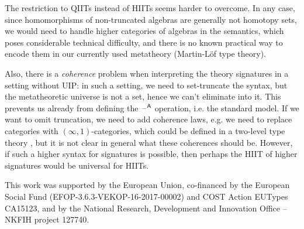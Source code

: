 \documentclass[acmsmall,review,anonymous]{acmart}\settopmatter{printfolios=true,printccs=false,printacmref=false}
\begin{document}
The restriction to QIITs instead of HIITs seems harder to overcome. In
any case, since homomorphisms of non-truncated algebras are generally
not homotopy sets, we would need to handle higher categories of
algebras in the semantics, which poses considerable technical
difficulty, and there is no known practical way to encode them in our
currently used metatheory (Martin-Löf type theory).

Also, there is a \emph{coherence} problem when interpreting the theory
signatures in a setting without UIP: in such a setting, we need to
set-truncate the syntax, but the metatheoretic universe is not a set,
hence we can't eliminate into it. This prevents us already from
defining the $\mathord{\hspace{1pt}\text{--}\hspace{1pt}}^{\mathsf{A}}$ operation, i.e. the standard model. If we
want to omit truncation, we need to add coherence laws, e.g. we need
to replace categories with $(\infty,1)$-categories, which could be
defined in a two-level type theory \cite{semisegal}, but it is not
clear in general what these coherences should be. However, if such a
higher syntax for signatures is possible, then perhaps the HIIT of
higher signatures would be universal for HIITs.




\begin{acks}                            %
This work was supported by the European Union, co-financed by the
European Social Fund (EFOP-3.6.3-VEKOP-16-2017-00002) and COST Action
EUTypes CA15123, and by the National Research, Development and
Innovation Office -- NKFIH project 127740.
\end{acks}



\end{document}
